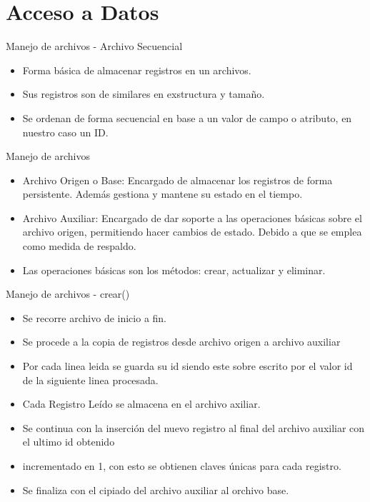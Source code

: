 \section{Acceso a Datos}

\begin{frame}{Manejo de archivos - Archivo Secuencial}
	\begin{block}{}
	\begin{itemize}
\item Forma básica de almacenar registros en un archivos.
\item Sus registros son de similares en exstructura y tama\~no.
\item Se ordenan de forma secuencial en base a un valor de campo o atributo, en nuestro caso un ID.
\end{itemize}
\end{block}
\end{frame}


\begin{frame}{Manejo de archivos}
	\begin{itemize}
\item Archivo Origen o Base: Encargado de almacenar los registros de forma persistente. Adem\'as gestiona y mantene su estado en el tiempo.
\item Archivo Auxiliar:  Encargado de dar soporte a las operaciones b\'asicas sobre el archivo origen, permitiendo hacer cambios de estado. Debido a que se emplea como medida de respaldo.
\item Las operaciones b\'asicas son los m\'etodos: crear, actualizar y eliminar.
\end{itemize}
\end{frame}

\begin{frame}{Manejo de archivos - crear()}
	\begin{itemize}
\item Se recorre archivo de inicio a fin.
\item Se procede a la copia de registros desde archivo origen a archivo auxiliar
\item Por cada linea leida se guarda su id siendo este sobre escrito por el valor id de la siguiente linea procesada.
\item Cada Registro Le\'ido se almacena en el archivo axiliar.
\item Se continua con la inserci\'on del nuevo registro al final del archivo auxiliar con el ultimo id obtenido \item incrementado en 1, con esto se obtienen claves \'unicas para cada registro.
\item Se finaliza con el cipiado del archivo auxiliar al orchivo base.
\end{itemize}
\end{frame}


